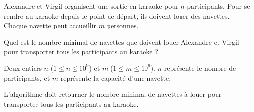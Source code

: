 \problemname{\problemyamlname}


Alexandre et Virgil organisent une sortie en karaoke pour $n$ participants.
Pour se rendre au karaoke depuis le point de départ, ils doivent louer des navettes. Chaque navette peut accueillir $m$ personnes.

Quel est le nombre minimal de navettes que doivent louer Alexandre et Virgil pour transporter tous les participants au karaoke ?

\begin{Input}
	Deux entiers $n$ ($1 \le n \le 10^9$) et $m$ ($1 \le m \le 10^6$). $n$ représente le nombre de participants, et $m$ représente la capacité d'une navette.
\end{Input}

\begin{Output}
	L'algorithme doit retourner le nombre minimal de navettes à louer pour transporter tous les participants au karaoke.
\end{Output}
